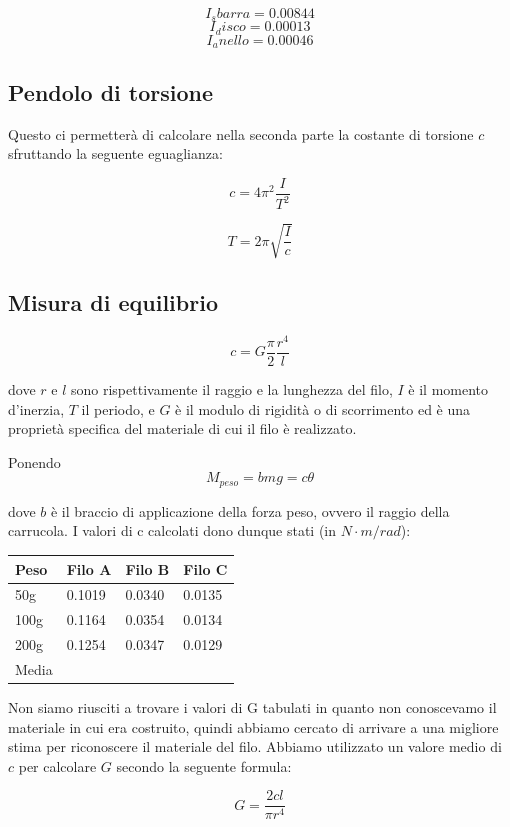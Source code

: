 \documentclass[a4paper,10pt]{report}
\begin{document}
$$ I_sbarra = 0.00844 $$
$$ I_disco = 0.00013 $$
$$ I_anello = 0.00046 $$

\subsection{Pendolo di torsione}


Questo ci permetterà di calcolare nella seconda parte la costante di torsione $c$ sfruttando la seguente eguaglianza:

$$ c = 4\pi^2\frac{I}{T^2} $$


$$ T = 2\pi \sqrt{\frac{I}{c}}$$




\subsection{Misura di equilibrio}

$$ c = G \frac{\pi}{2}\frac{r^4}{l} $$

dove $r$ e $l$ sono rispettivamente il raggio e la lunghezza del filo, $I$ è il momento d'inerzia, $T$ il periodo, e $G$ è il modulo di rigidità o di scorrimento ed è una proprietà specifica del materiale di cui il filo è realizzato.

Ponendo
$$ M_{peso} = bmg = c\theta $$

dove $b$ è il braccio di applicazione della forza peso, ovvero il raggio della carrucola.
I valori di c calcolati dono dunque stati (in $N\cdot m/rad$):

\begin{center}
\begin{tabular}{l|lll}
Peso & Filo A & Filo B & Filo C \\
\midrule
50g & 0.1019 & 0.0340 & 0.0135 \\
100g & 0.1164 & 0.0354 & 0.0134 \\
200g & 0.1254 & 0.0347 & 0.0129 \\
\midrule
Media & & & \\
\end{tabular}
\end{center}

Non siamo riusciti a trovare i valori di G tabulati in quanto non conoscevamo il materiale in cui era costruito, quindi abbiamo cercato di arrivare a una migliore stima per riconoscere il materiale del filo. Abbiamo utilizzato un valore medio di $c$ per calcolare $G$ secondo la seguente formula:

$$ G = \frac{2cl}{\pi r^4} $$
\end{document}
